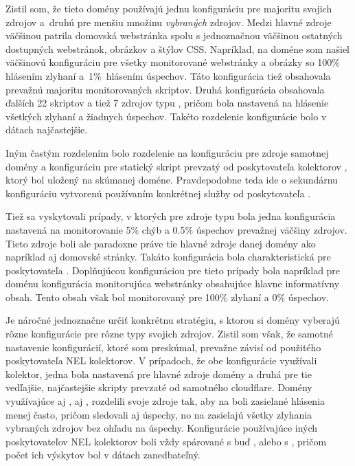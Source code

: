 Zistil som, že tieto domény používajú jednu konfiguráciu pre majoritu svojich zdrojov \mbox{a druhú} pre menšiu množinu \textit{vybraných} zdrojov.
Medzi hlavné zdroje väčšinou patrila domovská webstránka spolu s jednoznačnou väčšinou ostatných dostupných webstránok, obrázkov a štýlov CSS.
Napríklad, na doméne  som našiel väčšinovú konfiguráciu pre všetky monitorované webstránky a obrázky so 100\% hlásením zlyhaní \mbox{a 1\% hlásením} úspechov. 
Táto konfigurácia tiež obsahovala prevažnú majoritu monitorovaných skriptov.
Druhá konfigurácia obsahovala ďalších 22 skriptov a tiež 7 zdrojov typu ,
pričom bola nastavená na hlásenie všetkých zlyhaní a žiadnych úspechov.
Takéto rozdelenie konfigurácie bolo v dátach najčastejšie.

Iným častým rozdelením bolo rozdelenie na konfiguráciu pre zdroje samotnej domény a konfiguráciu pre statický skript prevzatý od poskytovateľa kolektorov , ktorý bol uložený na skúmanej doméne.
Pravdepodobne teda ide o sekundárnu konfiguráciu vytvorenú používaním konkrétnej služby od poskytovateľa .

Tiež sa vyskytovali prípady, v ktorých pre zdroje typu  bola jedna konfigurácia nastavená na monitorovanie 5\% chýb a 0.5\% úspechov prevažnej väčšiny zdrojov.
Tieto zdroje boli ale paradoxne práve tie hlavné zdroje danej domény ako napríklad aj domovské stránky.
Takáto konfigurácia bola charakteristická pre poskytovateľa .
Doplňujúcou konfiguráciou pre tieto prípady bola napríklad pre doménu  konfigurácia monitorujúca webstránky obsahujúce hlavne informatívny obsah.
Tento obsah však bol monitorovaný pre 100\% zlyhaní a 0\% úspechov.

Je náročné jednoznačne určiť konkrétnu stratégiu, s ktorou si domény vyberajú rôzne konfigurácie pre rôzne typy svojich zdrojov.
Zistil som však, že samotné nastavenie konfigurácií, ktoré som preskúmal, prevažne závisí od použitého poskytovateľa NEL kolektorov.
V prípadoch, že obe konfigurácie využívali  kolektor, jedna bola nastavená pre hlavné zdroje domény a druhá pre tie vedľajšie, najčastejšie skripty prevzaté od samotného cloudflare.
Domény využívajúce aj , aj , rozdelili svoje zdroje tak, aby na  boli zasielané hlásenia menej často, pričom sledovali aj úspechy, no na  zasielajú všetky zlyhania vybraných zdrojov bez ohľadu na úspechy. 
Konfigurácie používajúce iných poskytovateľov NEL kolektorov boli vždy spárované s buď , alebo s , pričom počet ich výskytov bol v dátach zanedbateľný.
